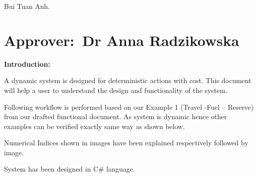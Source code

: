 \documentclass[12pt]{article}
\begin{document}
\begin{adjustwidth}{0.5in}{0.0in}
{\fontsize{14pt}{16.8pt}\selectfont Bui Tuan Anh. \tabto{2.71in} \tab \par}\par

\end{adjustwidth}


\vspace{\baselineskip}

\vspace{\baselineskip}
\section{Approver:\  Dr Anna Radzikowska}

\vspace{\baselineskip}

\vspace{\baselineskip}

\vspace{\baselineskip}
\tab \tab \tab \tab \tab \tab {}\par


\vspace{\baselineskip}

\vspace{\baselineskip}

\vspace{\baselineskip}

\vspace{\baselineskip}

\vspace{\baselineskip}
\textbf{Introduction: }\par

\tab A dynamic system is designed for deterministic actions with cost. This document will help a user to understand the design and functionality of the system.\par

Following workflow is performed based on our Example 1 (Travel -Fuel – Reserve) from our drafted functional document. As system is dynamic hence other examples can be verified exactly same way as shown below.\par

Numerical Indices shown in images have been explained respectively followed by image.\par


\vspace{\baselineskip}
System has been designed in C$\#$  language.\par
\end{document}
